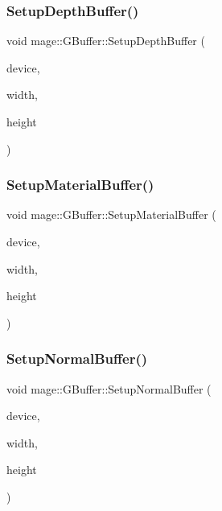 \subsubsection{\texorpdfstring{Setup\+Depth\+Buffer()}{SetupDepthBuffer()}}
{\footnotesize\ttfamily void mage\+::\+G\+Buffer\+::\+Setup\+Depth\+Buffer (\begin{DoxyParamCaption}\item[{I\+D3\+D11\+Device2 $\ast$}]{device,  }\item[{\hyperlink{namespacemage_a41c104c036fba3756a74e19f793eeaa1}{U32}}]{width,  }\item[{\hyperlink{namespacemage_a41c104c036fba3756a74e19f793eeaa1}{U32}}]{height }\end{DoxyParamCaption})\hspace{0.3cm}{\ttfamily [private]}}

\hypertarget{structmage_1_1_g_buffer_ae0cd8580302b590e0f0c8e4cb70e1d89}{}\label{structmage_1_1_g_buffer_ae0cd8580302b590e0f0c8e4cb70e1d89} 
\subsubsection{\texorpdfstring{Setup\+Material\+Buffer()}{SetupMaterialBuffer()}}
{\footnotesize\ttfamily void mage\+::\+G\+Buffer\+::\+Setup\+Material\+Buffer (\begin{DoxyParamCaption}\item[{I\+D3\+D11\+Device2 $\ast$}]{device,  }\item[{\hyperlink{namespacemage_a41c104c036fba3756a74e19f793eeaa1}{U32}}]{width,  }\item[{\hyperlink{namespacemage_a41c104c036fba3756a74e19f793eeaa1}{U32}}]{height }\end{DoxyParamCaption})\hspace{0.3cm}{\ttfamily [private]}}

\hypertarget{structmage_1_1_g_buffer_a6a4b6b500f3fa6255d094389e4893427}{}\label{structmage_1_1_g_buffer_a6a4b6b500f3fa6255d094389e4893427} 
\subsubsection{\texorpdfstring{Setup\+Normal\+Buffer()}{SetupNormalBuffer()}}
{\footnotesize\ttfamily void mage\+::\+G\+Buffer\+::\+Setup\+Normal\+Buffer (\begin{DoxyParamCaption}\item[{I\+D3\+D11\+Device2 $\ast$}]{device,  }\item[{\hyperlink{namespacemage_a41c104c036fba3756a74e19f793eeaa1}{U32}}]{width,  }\item[{\hyperlink{namespacemage_a41c104c036fba3756a74e19f793eeaa1}{U32}}]{height }\end{DoxyParamCaption})\hspace{0.3cm}{\ttfamily [private]}}



